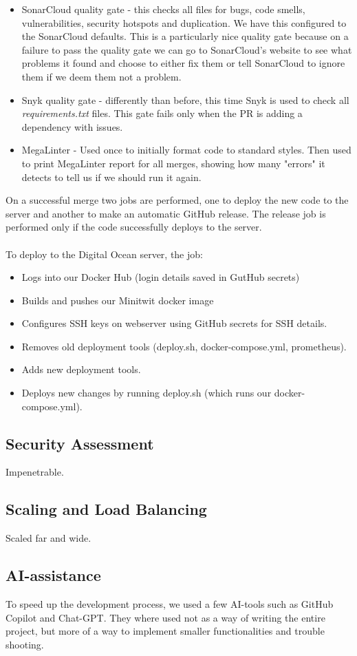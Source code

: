 \begin{itemize}
    \item SonarCloud quality gate - this checks all files for bugs, code smells, vulnerabilities, security hotspots and duplication. We have this configured to the SonarCloud defaults. This is a particularly nice quality gate because on a failure to pass the quality gate we can go to SonarCloud's website to see what problems it found and choose to either fix them or tell SonarCloud to ignore them if we deem them not a problem.
    \item Snyk quality gate - differently than before, this time Snyk is used to check all \textit{requirements.txt} files. This gate fails only when the PR is adding a dependency with issues.
    \item MegaLinter - Used once to initially format code to standard styles. Then used to print MegaLinter report for all merges, showing how many "errors" it detects to tell us if we should run it again.
\end{itemize}

On a successful merge two jobs are performed, one to deploy the new code to the server and another to make an automatic GitHub release. The release job is performed only if the code successfully deploys to the server.
\\\\
To deploy to the Digital Ocean server, the job:

\begin{itemize}
    \item Logs into our Docker Hub (login details saved in GutHub secrets)
    \item Builds and pushes our Minitwit docker image %
    \item Configures SSH keys on webserver using GitHub secrets for SSH details.
    \item Removes old deployment tools (deploy.sh, docker-compose.yml, prometheus).
    \item Adds new deployment tools.
    \item Deploys new changes by running deploy.sh (which runs our docker-compose.yml).
\end{itemize}

\subsection{Security Assessment}

Impenetrable.

\subsection{Scaling and Load Balancing}

Scaled far and wide.

\subsection{AI-assistance}

To speed up the development process, we used a few AI-tools such as GitHub Copilot and Chat-GPT. They where used not as a way of writing the entire project, but more of a way to implement smaller functionalities and trouble shooting. 